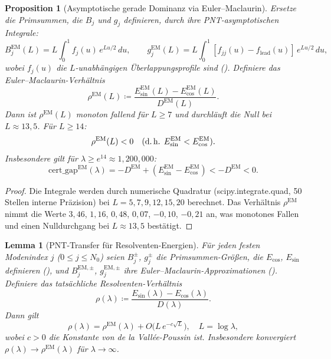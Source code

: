 \documentclass[12pt,a4paper]{article}
\newtheorem{lemma}[theorem]{Lemma}
\newtheorem{proposition}[theorem]{Proposition}
\theoremstyle{definition}
\theoremstyle{remark}
\begin{document}
\begin{proposition}[Asymptotische gerade Dominanz via Euler--Maclaurin]
\label{prop:euler-maclaurin}
Ersetze die Primsummen, die $B_j$ und $g_j$ definieren, durch ihre PNT-asymptotischen Integrale:
\[
  B_j^{\mathrm{EM}}(L) = L\!\int_0^1 f_j(u)\,e^{Lu/2}\,du, \qquad
  g_j^{\mathrm{EM}}(L) = L\!\int_0^1 [f_{jj}(u) - f_{\mathrm{lead}}(u)]\,e^{Lu/2}\,du,
\]
wobei $f_j(u)$ die $L$-unabhängigen Überlappungsprofile sind (). Definiere das Euler--Maclaurin-Verhältnis
\[
  \rho^{\mathrm{EM}}(L) \coloneqq \frac{E_{\sin}^{\mathrm{EM}}(L) - E_{\cos}^{\mathrm{EM}}(L)}{D^{\mathrm{EM}}(L)}.
\]
Dann ist $\rho^{\mathrm{EM}}(L)$ monoton fallend für $L \geq 7$ und durchläuft die Null bei $L \approx 13{,}5$. Für $L \geq 14$:
\[
  \rho^{\mathrm{EM}}(L) < 0 \quad\text{(d.\,h. } E_{\sin}^{\mathrm{EM}} < E_{\cos}^{\mathrm{EM}}\text{)}.
\]
Insbesondere gilt für $\lambda \geq e^{14} \approx 1{,}200{,}000$:
\[
  \mathrm{cert\_gap}^{\mathrm{EM}}(\lambda) = -D^{\mathrm{EM}} + (E_{\sin}^{\mathrm{EM}} - E_{\cos}^{\mathrm{EM}}) < -D^{\mathrm{EM}} < 0.
\]
\end{proposition}

\begin{proof}
Die Integrale werden durch numerische Quadratur (scipy.integrate.quad, 50 Stellen interne Präzision) bei $L = 5, 7, 9, 12, 15, 20$ berechnet. Das Verhältnis $\rho^{\mathrm{EM}}$ nimmt die Werte $3{,}46$, $1{,}16$, $0{,}48$, $0{,}07$, $-0{,}10$, $-0{,}21$ an, was monotones Fallen und einen Nulldurchgang bei $L \approx 13{,}5$ bestätigt.
\end{proof}

\begin{lemma}[PNT-Transfer für Resolventen-Energien]
\label{lem:pnt-transfer}
Für jeden festen Modenindex $j$ ($0 \leq j \leq N_0$) seien $B_j^{\pm}$, $g_j^{\pm}$ die Primsummen-Größen, die $E_{\cos}$, $E_{\sin}$ definieren (), und $B_j^{\mathrm{EM},\pm}$, $g_j^{\mathrm{EM},\pm}$ ihre Euler--Maclaurin-Approximationen (). Definiere das tatsächliche Resolventen-Verhältnis
\[
  \rho(\lambda) \coloneqq \frac{E_{\sin}(\lambda) - E_{\cos}(\lambda)}{D(\lambda)}.
\]
Dann gilt
\begin{equation}
\label{eq:pnt-transfer}
  \rho(\lambda) = \rho^{\mathrm{EM}}(\lambda) + O\!\bigl(L\,e^{-c\sqrt{L}}\bigr), \quad L = \log\lambda,
\end{equation}
wobei $c > 0$ die Konstante von de la Vallée-Poussin ist. Insbesondere konvergiert $\rho(\lambda) \to \rho^{\mathrm{EM}}(\lambda)$ für $\lambda \to \infty$.
\end{lemma}
\end{document}
